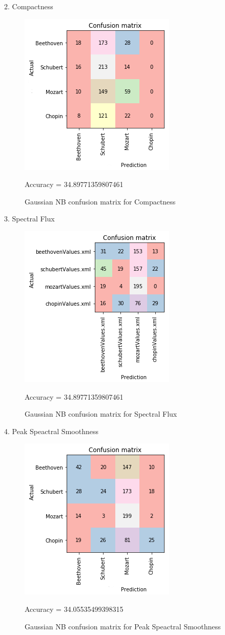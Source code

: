 \documentclass[11pt]{article}
\makeatletter
\def\maxwidth{\ifdim\Gin@nat@width>\linewidth\linewidth
    \else\Gin@nat@width\fi}
\let\Oldincludegraphics\includegraphics
\renewcommand{\includegraphics}[1]{\Oldincludegraphics[width=.8\maxwidth]{#1}}
\makeatother
\begin{document}
2. Compactness

\begin{figure}[h!]
\includegraphics{report/plots/Compact.png}
\caption{Gaussian NB confusion matrix for Compactness}
Accuracy = 34.89771359807461
\end{figure}

3. Spectral Flux

\begin{figure}[h!]
\includegraphics{report/plots/SpectralFlux.png}
\caption{Gaussian NB confusion matrix for Spectral Flux}
Accuracy =
34.89771359807461
\end{figure}


4. Peak Speactral Smoothness

\begin{figure}[h!]
\includegraphics{report/plots/Smooth.png}
\caption{Gaussian NB confusion matrix for Peak Speactral Smoothness}
Accuracy = 34.05535499398315
\end{figure}
\end{document}
